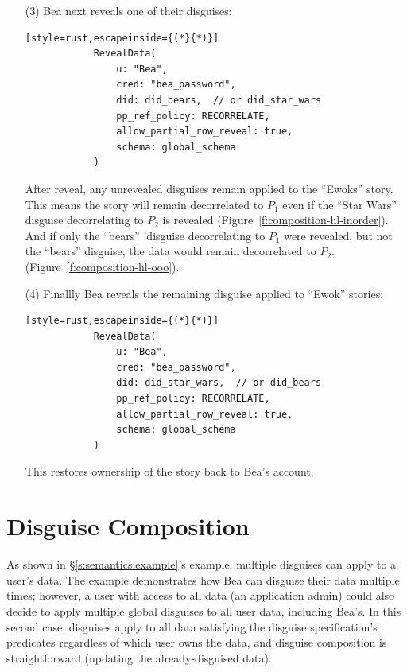 \begin{enumerate}[nosep]
    \item[(3)] Bea next reveals one of their disguises:
        \vspace{12pt}
        \begin{lstlisting}[style=rust,escapeinside={(*}{*)}]
            RevealData(
                u: "Bea", 
                cred: "bea_password",
                did: did_bears,  // or did_star_wars
                pp_ref_policy: RECORRELATE,
                allow_partial_row_reveal: true,
                schema: global_schema
            )
        \end{lstlisting}

        After reveal, any unrevealed disguises remain applied to the ``Ewoks''
        story.
        This means the story will remain decorrelated to $P_1$ even if the ``Star
        Wars'' disguise decorrelating to $P_2$ is revealed
        (Figure~\ref{f:composition-hl-inorder}).
        And if only the ``bears'' 'disguise decorrelating to $P_1$ were
        revealed, but not the ``bears'' disguise, the data would remain
        decorrelated to $P_2$.  (Figure~\ref{f:composition-hl-ooo}).

    \item[(4)] Finallly Bea reveals the remaining disguise applied to ``Ewok''
        stories:

        \vspace{12pt}
        \begin{lstlisting}[style=rust,escapeinside={(*}{*)}]
            RevealData(
                u: "Bea", 
                cred: "bea_password",
                did: did_star_wars,  // or did_bears
                pp_ref_policy: RECORRELATE,
                allow_partial_row_reveal: true,
                schema: global_schema
            )
        \end{lstlisting}
        
        This restores ownership of the story back to Bea's account.

\end{enumerate}


\section{Disguise Composition}
\label{s:semantics:hl:composition}

As shown in \S\ref{s:semantics:example}'s example, multiple disguises can apply
to a user's data. The example demonstrates how Bea can disguise their data
multiple times; however, a user with access to all data (\eg an application
admin) could also decide to apply multiple global disguises to all user data,
including Bea's.  In this second case, disguises apply to all data satisfying
the disguise specification's predicates regardless of which user owns the data,
and disguise composition is straightforward (updating the already-disguised
data).

